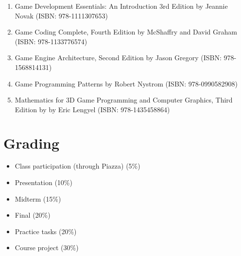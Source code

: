 \documentclass[12pt,a4paper,oneside]{article}
\begin{document}
            \begin{enumerate}
                \item Game Development Essentials: An Introduction 3rd Edition
                by Jeannie Novak (ISBN: 978-1111307653)
                \item Game Coding Complete, Fourth Edition by McShaffry and
                David Graham (ISBN: 978-1133776574)
                \item Game Engine Architecture, Second Edition by Jason Gregory
                (ISBN: 978-1568814131)
                \item Game Programming Patterns by Robert Nystrom (ISBN:
                978-0990582908)
                \item Mathematics for 3D Game Programming and Computer Graphics,
                Third Edition by by Eric Lengyel (ISBN: 978-1435458864)
            \end{enumerate}

    \section{Grading}

        \begin{itemize}
        	\item Class participation (through Piazza) (5\%)
            \item Presentation (10\%)
            \item Midterm (15\%)
            \item Final (20\%)
            \item Practice tasks (20\%)
            \item Course project (30\%)
        \end{itemize}
\end{document}
